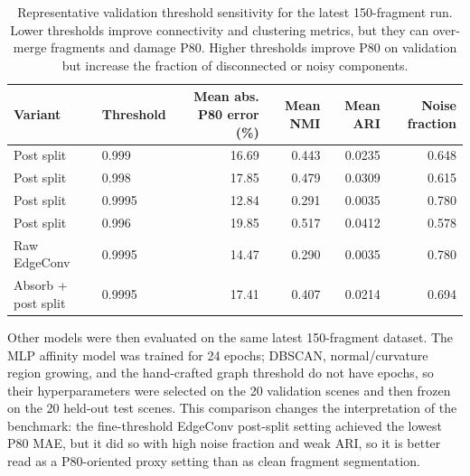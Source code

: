 \documentclass[11pt]{article}
\begin{document}
\begin{table}[t]
\centering
\small
\caption{Representative validation threshold sensitivity for the latest 150-fragment run. Lower thresholds improve connectivity and clustering metrics, but they can over-merge fragments and damage P80. Higher thresholds improve P80 on validation but increase the fraction of disconnected or noisy components.}
\label{tab:threshold-sweep}
\begin{tabular}{llrrrr}
\toprule
Variant & Threshold & Mean abs. P80 error (\%) & Mean NMI & Mean ARI & Noise fraction \\
\midrule
Post split & 0.999 & 16.69 & 0.443 & 0.0235 & 0.648 \\
Post split & 0.998 & 17.85 & 0.479 & 0.0309 & 0.615 \\
Post split & 0.9995 & 12.84 & 0.291 & 0.0035 & 0.780 \\
Post split & 0.996 & 19.85 & 0.517 & 0.0412 & 0.578 \\
Raw EdgeConv & 0.9995 & 14.47 & 0.290 & 0.0035 & 0.780 \\
Absorb + post split & 0.9995 & 17.41 & 0.407 & 0.0214 & 0.694 \\
\bottomrule
\end{tabular}
\end{table}

\begin{table}[t]
\centering
\small
\caption{Held-out test summary for the 20 test scenes.}
\label{tab:test-summary}
\end{table}

Other models were then evaluated on the same latest 150-fragment dataset. The MLP affinity model was trained for 24 epochs; DBSCAN, normal/curvature region growing, and the hand-crafted graph threshold do not have epochs, so their hyperparameters were selected on the 20 validation scenes and then frozen on the 20 held-out test scenes. This comparison changes the interpretation of the benchmark: the fine-threshold EdgeConv post-split setting achieved the lowest P80 MAE, but it did so with high noise fraction and weak ARI, so it is better read as a P80-oriented proxy setting than as clean fragment segmentation.
\end{document}
